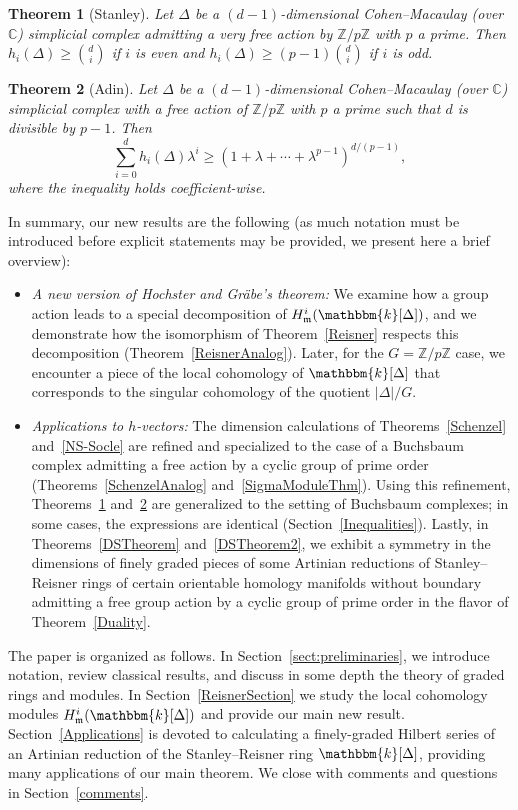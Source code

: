 \documentclass[10pt]{amsart}
\newtheorem{theo}{Theorem}[section]
\theoremstyle{definition}
\newcommand{\field}{\mathbbm{k}}
\newcommand{\CC}{{\mathbb C}}
\newcommand{\ZZ}{{\mathbb Z}}
\newcommand{\mideal}{\ensuremath{\mathfrak{m}}}
\begin{document}
\begin{theo}[Stanley]\label{StanleyCMVeryFree}
Let $\Delta$ be a $(d-1)$-dimensional Cohen--Macaulay (over $\CC$) simplicial complex admitting a very free action by $\ZZ/p\ZZ$ with $p$ a prime. Then $ h_i(\Delta)\ge \binom{d}{i}$ if $i$ is even and $h_i(\Delta)\ge (p-1)\binom{d}{i}$ if $i$ is odd.
\end{theo}

\begin{theo}[Adin]\label{AdinCMFree}
Let $\Delta$ be a $(d-1)$-dimensional Cohen--Macaulay (over $\CC$) simplicial complex with a free action of $\ZZ/p\ZZ$ with $p$ a prime such that $d$ is divisible by $p-1$. Then
\[
\sum_{i=0}^dh_i(\Delta)\lambda^i\ge (1+\lambda+\cdots +\lambda^{p-1})^{d/(p-1)},
\]
where the inequality holds coefficient-wise.
\end{theo}

In summary, our new results are the following (as much notation must be introduced before explicit statements may be provided, we present here a brief overview):
\begin{itemize}
\item \emph{A new version of Hochster and Gr\"abe's theorem:} We examine how a group action leads to a special decomposition of $H_\mideal^i(\field[\Delta])$, and we demonstrate how the isomorphism of Theorem~\ref{Reisner} respects this decomposition (Theorem~\ref{ReisnerAnalog}). Later, for the $G=\ZZ/p\ZZ$ case, we encounter a piece of the local cohomology of $\field[\Delta]$ that corresponds to the singular cohomology of the quotient $|\Delta|/G$.
\item \emph{Applications to $h$-vectors:} The dimension calculations of Theorems~\ref{Schenzel} and~\ref{NS-Socle} are refined and specialized to the case of a Buchsbaum complex admitting a free action by a cyclic group of prime order (Theorems~\ref{SchenzelAnalog} and~\ref{SigmaModuleThm}). Using this refinement, Theorems~\ref{StanleyCMVeryFree} and~\ref{AdinCMFree} are generalized to the setting of Buchsbaum complexes; in some cases, the expressions are identical (Section~\ref{Inequalities}). Lastly, in Theorems~\ref{DSTheorem} and~\ref{DSTheorem2}, we exhibit a symmetry in the dimensions of finely graded pieces of some Artinian reductions of Stanley--Reisner rings of certain orientable homology manifolds without boundary admitting a free group action by a cyclic group of prime order in the flavor of Theorem~\ref{Duality}.
\end{itemize}
The paper is organized as follows. In Section~\ref{sect:preliminaries}, we introduce notation, review classical results, and discuss in some depth the theory of graded rings and modules. In Section~\ref{ReisnerSection} we study the local cohomology modules $H_\mideal^i(\field[\Delta])$ and provide our main new result. Section~\ref{Applications} is devoted to calculating a finely-graded Hilbert series of an Artinian reduction of the Stanley--Reisner ring $\field[\Delta]$, providing many applications of our main theorem. We close with comments and questions in Section~\ref{comments}.
\end{document}
